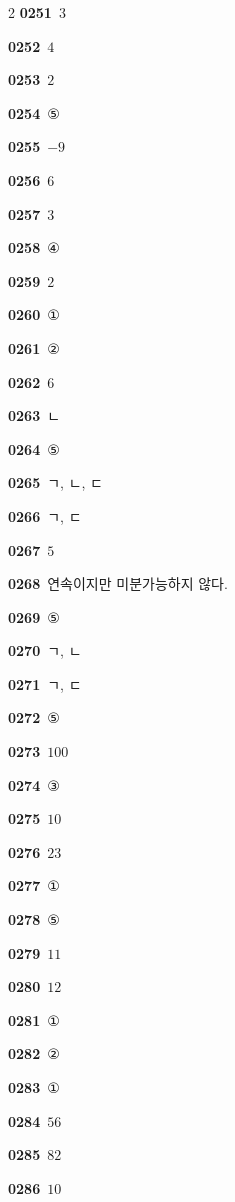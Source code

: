 \documentclass[10pt,a4paper]{article}
\begin{document}
\begin{multicols}{2}
\noindent\textbf{0251}\ $3$\par
\noindent\textbf{0252}\ $4$\par
\noindent\textbf{0253}\ $2$\par
\noindent\textbf{0254}\ ⑤\par
\noindent\textbf{0255}\ $-9$\par
\noindent\textbf{0256}\ $6$\par
\noindent\textbf{0257}\ $3$\par
\noindent\textbf{0258}\ ④\par
\noindent\textbf{0259}\ $2$\par
\noindent\textbf{0260}\ ①\par
\noindent\textbf{0261}\ ②\par
\noindent\textbf{0262}\ $6$\par
\noindent\textbf{0263}\ ㄴ\par
\noindent\textbf{0264}\ ⑤\par
\noindent\textbf{0265}\ ㄱ, ㄴ, ㄷ\par
\noindent\textbf{0266}\ ㄱ, ㄷ\par
\noindent\textbf{0267}\ $5$\par
\noindent\textbf{0268}\ 연속이지만 미분가능하지 않다.\par
\noindent\textbf{0269}\ ⑤\par
\noindent\textbf{0270}\ ㄱ, ㄴ\par
\noindent\textbf{0271}\ ㄱ, ㄷ\par
\noindent\textbf{0272}\ ⑤\par
\noindent\textbf{0273}\ $100$\par
\noindent\textbf{0274}\ ③\par
\noindent\textbf{0275}\ $10$\par
\noindent\textbf{0276}\ $23$\par
\noindent\textbf{0277}\ ①\par
\noindent\textbf{0278}\ ⑤\par
\noindent\textbf{0279}\ $11$\par
\noindent\textbf{0280}\ $12$\par
\noindent\textbf{0281}\ ①\par
\noindent\textbf{0282}\ ②\par
\noindent\textbf{0283}\ ①\par
\noindent\textbf{0284}\ $56$\par
\noindent\textbf{0285}\ $82$\par
\noindent\textbf{0286}\ $10$\par

\end{multicols}
\end{document}
